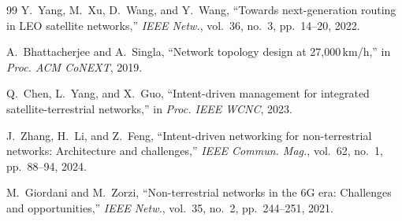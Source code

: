 \documentclass[10pt, conference, letterpaper]{IEEEtran}
\begin{document}
\begin{thebibliography}{99}
Y.~Yang, M.~Xu, D.~Wang, and Y.~Wang,
``Towards next-generation routing in LEO satellite networks,''
\textit{IEEE Netw.}, vol.~36, no.~3, pp.~14--20, 2022.

A.~Bhattacherjee and A.~Singla,
``Network topology design at 27,000\,km/h,''
in \textit{Proc. ACM CoNEXT}, 2019.

Q.~Chen, L.~Yang, and X.~Guo,
``Intent-driven management for integrated satellite-terrestrial
networks,'' in \textit{Proc. IEEE WCNC}, 2023.

J.~Zhang, H.~Li, and Z.~Feng,
``Intent-driven networking for non-terrestrial networks: Architecture
and challenges,'' \textit{IEEE Commun. Mag.}, vol.~62, no.~1,
pp.~88--94, 2024.

M.~Giordani and M.~Zorzi,
``Non-terrestrial networks in the 6G era: Challenges and
opportunities,'' \textit{IEEE Netw.}, vol.~35, no.~2, pp.~244--251,
2021.

\end{thebibliography}

% 
\end{document}
